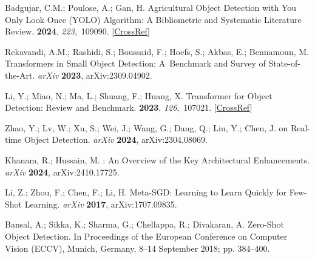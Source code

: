 \documentclass[12pt,a4paper,oneside]{report}
\begin{document}
\begin{thebibliography}{999}
Badgujar, C.M.; Poulose, A.; Gan, H.
\newblock Agricultural Object Detection with {{You Only Look Once}} ({{YOLO}})
{{Algorithm}}: {{A}} Bibliometric and Systematic Literature Review.
 {\bf 2024}, {\em
223},~109090. [\href{http://dx.doi.org/10.1016/j.compag.2024.109090}{CrossRef}]

Rekavandi, A.M.; Rashidi, S.; Boussaid, F.; Hoefs, S.; Akbas, E.; {Bennamoun},
M.
\newblock Transformers in {{Small Object Detection}}: \mbox{{{A Benchmark}}} and
{{Survey}} of {{State-of-the-Art}}. {\em arXiv} {\bf 2023}, arXiv:2309.04902.

Li, Y.; Miao, N.; Ma, L.; Shuang, F.; Huang, X.
\newblock Transformer for Object Detection: {{Review}} and Benchmark.
 {\bf 2023},
{\em 126},~107021. [\href{http://dx.doi.org/10.1016/j.engappai.2023.107021}{CrossRef}]

Zhao, Y.; Lv, W.; Xu, S.; Wei, J.; Wang, G.; Dang, Q.; Liu, Y.; Chen, J.
 on {{Real-time Object Detection}}. {\em arXiv} {\bf2024}, arXiv:2304.08069.

Khanam, R.; Hussain, M.
: {{An Overview}} of the {{Key Architectural
Enhancements}}. {\em arXiv} {\bf2024}, arXiv:2410.17725. 

Li, Z.; Zhou, F.; Chen, F.; Li, H.
\newblock Meta-{{SGD}}: {{Learning}} to {{Learn Quickly}} for {{Few-Shot
Learning}}. {\em arXiv} {\bf2017}, arXiv:1707.09835. 

Bansal, A.; Sikka, K.; Sharma, G.; Chellappa, R.; Divakaran, A.
\newblock Zero-{{Shot Object Detection}}.
\newblock In Proceedings of the European Conference on Computer Vision (ECCV), Munich, Germany, 8--14 September 2018; pp. 384--400. 


\end{thebibliography}
\end{document}
